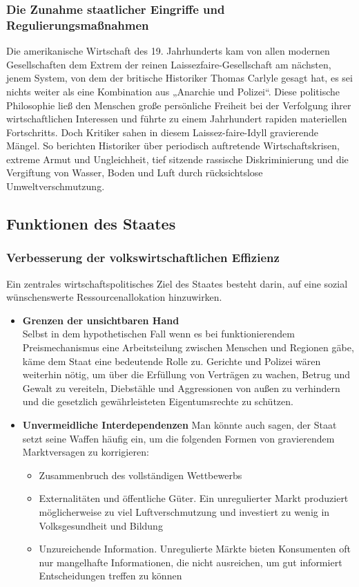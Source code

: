 \documentclass[10pt]{scrartcl}
\begin{document}
\subsubsection{Die Zunahme staatlicher Eingriffe und Regulierungsmaßnahmen}
Die amerikanische Wirtschaft des 19. Jahrhunderts kam von allen modernen Gesellschaften dem Extrem der reinen Laissezfaire-Gesellschaft am nächsten, jenem System, von dem der britische Historiker Thomas Carlyle gesagt hat, es sei nichts weiter als eine Kombination aus „Anarchie und Polizei“. Diese politische Philosophie ließ den Menschen große persönliche Freiheit bei der Verfolgung ihrer wirtschaftlichen Interessen und führte zu einem Jahrhundert rapiden materiellen Fortschritts. Doch Kritiker sahen in diesem Laissez-faire-Idyll gravierende Mängel. So berichten Historiker über periodisch auftretende Wirtschaftskrisen, extreme Armut und Ungleichheit, tief sitzende rassische Diskriminierung und die Vergiftung von Wasser, Boden und Luft durch rücksichtslose Umweltverschmutzung.

\subsection{Funktionen des Staates}
\subsubsection{Verbesserung der volkswirtschaftlichen Effizienz}
Ein zentrales wirtschaftspolitisches Ziel des Staates besteht darin, auf eine sozial wünschenswerte Ressourcenallokation hinzuwirken.
\begin{itemize}
\item {\bf Grenzen der unsichtbaren Hand} \\
Selbst in dem hypothetischen Fall wenn es bei funktionierendem Preismechanismus eine Arbeitsteilung zwischen Menschen und Regionen gäbe, käme dem Staat eine bedeutende Rolle zu. Gerichte und Polizei wären weiterhin nötig, um über die Erfüllung von Verträgen zu wachen, Betrug und Gewalt zu vereiteln, Diebstähle und Aggressionen von außen zu verhindern und die gesetzlich gewährleisteten Eigentumsrechte zu schützen.
\item {\bf Unvermeidliche Interdependenzen} 
Man könnte auch sagen, der Staat setzt seine Waffen häufig ein, um die folgenden Formen von gravierendem Marktversagen zu korrigieren:
\begin{itemize}
\item Zusammenbruch des vollständigen Wettbewerbs
\item Externalitäten und öffentliche Güter. Ein unregulierter Markt produziert möglicherweise zu viel Luftverschmutzung und investiert zu wenig in Volksgesundheit und Bildung 
\item Unzureichende Information. Unregulierte Märkte bieten Konsumenten oft nur mangelhafte Informationen, die nicht ausreichen, um gut informiert Entscheidungen treffen zu können
\end{itemize}
\end{itemize}
\end{document}
